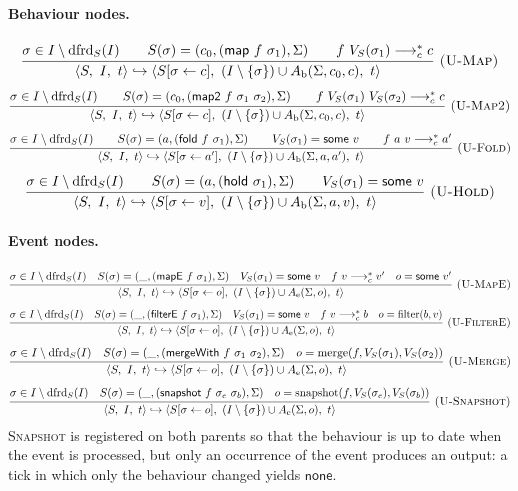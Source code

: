 \documentclass{article}
\makeatletter
\newcommand{\kw}[1]{\mathsf{#1}}
\newcommand{\none}{\kw{none}}
\newcommand{\some}[1]{\kw{some}\ #1}
\newcommand{\cfg}[3]{\langle #1,\ #2,\ #3\rangle}
\newcommand{\cstar}{\mathrel{\longrightarrow_{c}^{*}}}
\newcommand{\ustep}{\hookrightarrow}
\newcommand{\dfrd}{\mathrm{dfrd}}
\newcommand{\fire}{\sigma \in I \setminus \dfrd_S(I)}
\newcommand{\rul}[3]{\[\dfrac{\begin{array}{@{}c@{}}#2\end{array}}{\begin{array}{@{}c@{}}#3\end{array}}\ \textsc{#1}\]}
\makeatother
\begin{document}
\paragraph{Behaviour nodes.}
\rul{(U-Map)}{\fire \qquad S(\sigma) = (c_0,(\kw{map}\ f\ \sigma_1),\Sigma) \qquad f\ V_S(\sigma_1) \cstar c}
{\cfg{S}{I}{t} \ustep \cfg{S[\sigma \leftarrow c]}{(I \setminus \{\sigma\}) \cup A_{\mathrm{b}}(\Sigma,c_0,c)}{t}}
\rul{(U-Map2)}{\fire \qquad S(\sigma) = (c_0,(\kw{map2}\ f\ \sigma_1\ \sigma_2),\Sigma) \qquad f\ V_S(\sigma_1)\ V_S(\sigma_2) \cstar c}
{\cfg{S}{I}{t} \ustep \cfg{S[\sigma \leftarrow c]}{(I \setminus \{\sigma\}) \cup A_{\mathrm{b}}(\Sigma,c_0,c)}{t}}
\rul{(U-Fold)}{\fire \qquad S(\sigma) = (a,(\kw{fold}\ f\ \sigma_1),\Sigma) \qquad V_S(\sigma_1) = \some{v} \qquad f\ a\ v \cstar a'}
{\cfg{S}{I}{t} \ustep \cfg{S[\sigma \leftarrow a']}{(I \setminus \{\sigma\}) \cup A_{\mathrm{b}}(\Sigma,a,a')}{t}}
\rul{(U-Hold)}{\fire \qquad S(\sigma) = (a,(\kw{hold}\ \sigma_1),\Sigma) \qquad V_S(\sigma_1) = \some{v}}
{\cfg{S}{I}{t} \ustep \cfg{S[\sigma \leftarrow v]}{(I \setminus \{\sigma\}) \cup A_{\mathrm{b}}(\Sigma,a,v)}{t}}

\paragraph{Event nodes.}
\rul{(U-MapE)}{\fire \quad S(\sigma) = (\_,(\kw{mapE}\ f\ \sigma_1),\Sigma) \quad V_S(\sigma_1) = \some{v} \quad f\ v \cstar v' \quad o = \some{v'}}
{\cfg{S}{I}{t} \ustep \cfg{S[\sigma \leftarrow o]}{(I \setminus \{\sigma\}) \cup A_{\mathrm{e}}(\Sigma,o)}{t}}
\rul{(U-FilterE)}{\fire \quad S(\sigma) = (\_,(\kw{filterE}\ f\ \sigma_1),\Sigma) \quad V_S(\sigma_1) = \some{v} \quad f\ v \cstar b \quad o = \mathrm{filter}(b,v)}
{\cfg{S}{I}{t} \ustep \cfg{S[\sigma \leftarrow o]}{(I \setminus \{\sigma\}) \cup A_{\mathrm{e}}(\Sigma,o)}{t}}
\rul{(U-Merge)}{\fire \quad S(\sigma) = (\_,(\kw{mergeWith}\ f\ \sigma_1\ \sigma_2),\Sigma) \quad o = \mathrm{merge}(f,V_S(\sigma_1),V_S(\sigma_2))}
{\cfg{S}{I}{t} \ustep \cfg{S[\sigma \leftarrow o]}{(I \setminus \{\sigma\}) \cup A_{\mathrm{e}}(\Sigma,o)}{t}}
\rul{(U-Snapshot)}{\fire \quad S(\sigma) = (\_,(\kw{snapshot}\ f\ \sigma_e\ \sigma_b),\Sigma) \quad o = \mathrm{snapshot}(f,V_S(\sigma_e),V_S(\sigma_b))}
{\cfg{S}{I}{t} \ustep \cfg{S[\sigma \leftarrow o]}{(I \setminus \{\sigma\}) \cup A_{\mathrm{e}}(\Sigma,o)}{t}}
\textsc{Snapshot} is registered on both parents so that the behaviour is up to date when the event is processed, but only an occurrence of the event produces an output: a tick in which only the behaviour changed yields $\none$.
\end{document}
